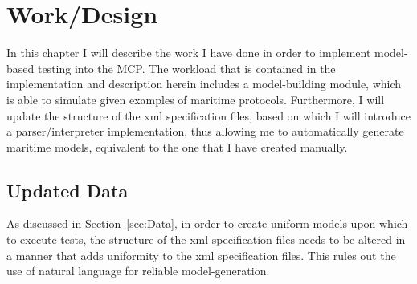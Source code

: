 \chapter{Work/Design}

In this chapter I will describe the work I have done in order to implement model-based testing into the MCP. The workload that is contained in the implementation and description herein includes a model-building module, which is able to simulate given examples of maritime protocols. Furthermore, I will update the structure of the xml specification files, based on which I will introduce a parser/interpreter implementation, thus allowing me to automatically generate maritime models, equivalent to the one that I have created manually.

\section{Updated Data}

As discussed in Section~\ref{sec:Data}, in order to create uniform models upon which to execute tests, the structure of the xml specification files needs to be altered in a manner that adds uniformity to the xml specification files. This rules out the use of natural language for reliable model-generation.

